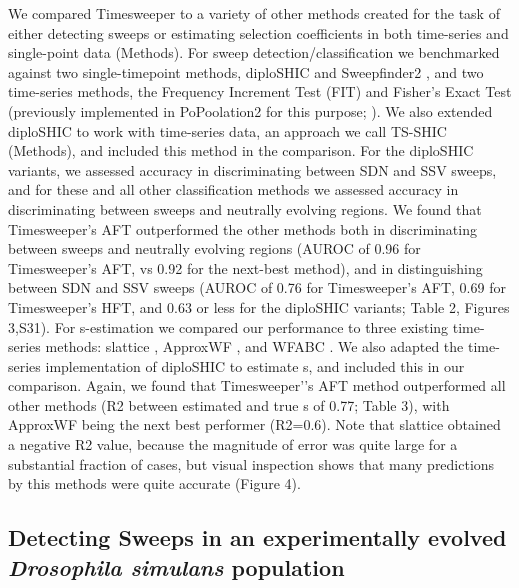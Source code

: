 We compared Timesweeper to a variety of other methods created for the task of either detecting sweeps or estimating selection coefficients in both time-series and single-point data (Methods). For sweep detection/classification we benchmarked against two single-timepoint methods, diploSHIC \cite{kernDiploSHICUpdated2018} and Sweepfinder2 \cite{degiorgioSweepFinder2IncreasedSensitivity2016}, and two time-series methods, the Frequency Increment Test (FIT) \cite{federIdentifyingSignaturesSelection2014} and Fisher’s Exact Test (previously implemented in PoPoolation2 for this purpose; \cite{koflerPoPoolation2IdentifyingDifferentiation2011}). We also extended diploSHIC to work with time-series data, an approach we call TS-SHIC (Methods), and included this method in the comparison. For the diploSHIC variants, we assessed accuracy in discriminating between SDN and SSV sweeps, and for these and all other classification methods we assessed accuracy in discriminating between sweeps and neutrally evolving regions. We found that Timesweeper’s AFT outperformed the other methods both in discriminating between sweeps and neutrally evolving regions (AUROC of 0.96 for Timesweeper’s AFT, vs 0.92 for the next-best method), and in distinguishing between SDN and SSV sweeps (AUROC of 0.76 for Timesweeper’s AFT, 0.69 for Timesweeper’s HFT, and 0.63 or less for the diploSHIC variants; Table 2, Figures 3,S31).
For s-estimation we compared our performance to three existing time-series methods: slattice \cite{mathiesonEstimatingSelectionCoefficients2013}, ApproxWF \cite{ferrer-admetllaApproximateMarkovModel2016}, and WFABC \cite{follWFABCWrightFisher2015}. We also adapted the time-series implementation of diploSHIC to estimate s, and included this in our comparison. Again, we found that Timesweeper’'s AFT method outperformed all other methods (R2 between estimated and true s of 0.77; Table 3), with ApproxWF being the next best performer (R2=0.6). Note that slattice obtained a negative R2 value, because the magnitude of error was quite large for a substantial fraction of cases, but visual inspection shows that many predictions by this methods were quite accurate (Figure 4). \\

\subsection{Detecting Sweeps in an experimentally evolved \textit{Drosophila simulans} population}

